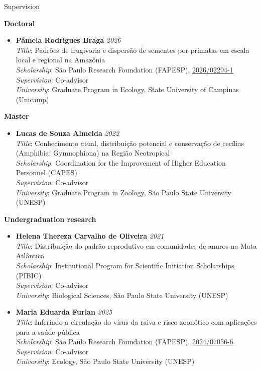 \documentclass{resume}
\begin{document}
\begin{rSection}{Supervision}

\textbf{Doctoral}
\begin{itemize}
\item \textbf{Pâmela Rodrigues Braga} \hfill{\em 2026}\\
\textit{Title}: Padrões de frugivoria e dispersão de sementes por primatas em escala local e regional na Amazônia\\ 
\textit{Scholarship}: São Paulo Research Foundation (FAPESP), \href{https://bv.fapesp.br/pt/bolsas/237569/padroes-de-frugivoria-e-dispersao-de-sementes-por-primatas-em-escala-local-e-regional-na-amazonia}{\underline{2026/02294-1}}\\
\textit{Supervision}: Co-advisor\\
\textit{University}: Graduate Program in Ecology, State University of Campinas (Unicamp)
\end{itemize}

\textbf{Master}
\begin{itemize}
\item \textbf{Lucas de Souza Almeida} \hfill{\em 2022}\\
\textit{Title}: Conhecimento atual, distribuição potencial e conservação de cecílias (Amphibia: Gymnophiona) na Região Neotropical\\ 
\textit{Scholarship}: Coordination for the Improvement of Higher Education Personnel (CAPES)\\
\textit{Supervision}: Co-advisor\\
\textit{University}: Graduate Program in Zoology, São Paulo State University (UNESP)
\end{itemize}

\textbf{Undergraduation research}
\begin{itemize}
\item \textbf{Helena Thereza Carvalho de Oliveira} \hfill{\em 2021}\\
\textit{Title}: Distribuição do padrão reprodutivo em comunidades de anuros na Mata Atlântica\\
\textit{Scholarship}: Institutional Program for Scientific Initiation Scholarships (PIBIC)\\
\textit{Supervision}: Co-advisor\\
\textit{University}: Biological Sciences, São Paulo State University (UNESP)

\item \textbf{Maria Eduarda Furlan} \hfill{\em 2025}\\
\textit{Title}: Inferindo a circulação do vírus da raiva e risco zoonótico com aplicações para a saúde pública\\
\textit{Scholarship}: São Paulo Research Foundation (FAPESP), \href{https://bv.fapesp.br/pt/bolsas/219630/inferindo-a-circulacao-do-virus-da-raiva-e-risco-zoonotico-com-aplicacoes-para-a-saude-publica/}{\underline{2024/07056-6}}\\
\textit{Supervision}: Co-advisor\\
\textit{University}: Ecology, São Paulo State University (UNESP)


\end{itemize}
\end{rSection}
\end{document}
